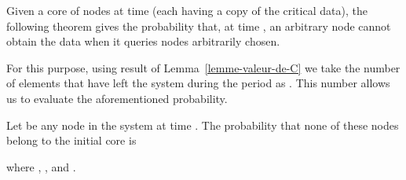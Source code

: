 \documentclass[]{llncs}
\begin{document}
Given a  core of  nodes at  time  (each having a copy of the
critical  data), 
the following theorem  gives the probability that, at time , an 
arbitrary node cannot obtain the data when it queries  nodes arbitrarily 
chosen.  

For this purpose, using result of Lemma~\ref{lemme-valeur-de-C} we take the 
number of elements that have left the system during the period  as 
.
This number allows us to evaluate the aforementioned probability.


\begin{theorem}
	\label{theo-proba-pas-vert}
Let  be any node in the system at time . The
	probability that none of these nodes belong to the initial core is
	
	where , 
	, and 
	.
\end{theorem}
\end{document}
